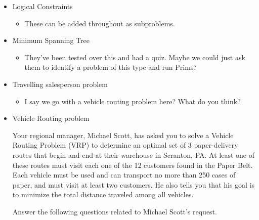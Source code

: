 \documentclass[12pt]{exam}
\newcommand{\answerbox}[3]{%
  \fbox{%
    \begin{minipage}[#1]{#2}
      \hfill\vspace{#3}
    \end{minipage}
  }
}
\newcommand{\answerboxone}[2]{%
  \answerbox{#1}{6.0in}{#2} 
}
\begin{document}
\begin{itemize}
	\item Logical Constraints
	\begin{itemize}
		\item These can be added throughout as subproblems.
	\end{itemize}
	
	\item Minimum Spanning Tree
	\begin{itemize}
		\item They've been tested over this and had a quiz. Maybe we could just ask them to identify a problem of this type and run Prims?
	\end{itemize}
	\item Travelling salesperson problem
	\begin{itemize}
		\item I say we go with a vehicle routing problem here? What do you think?
	\end{itemize}
	\item Vehicle Routing problem


Your regional manager, Michael Scott, has asked you to solve a Vehicle Routing Problem (VRP) to determine an optimal set of 3 paper-delivery routes that begin and end at their warehouse in Scranton, PA. At least one of these routes must visit each one of the 12 customers found in the Paper Belt. Each vehicle must be used and can transport no more than 250 cases of paper, and must visit at least two customers. He also tells you that his goal is to minimize the total distance traveled among all vehicles. 



\vspace{.5cm}
Answer the following questions related to Michael Scott's request.
\end{itemize}
\end{document}

